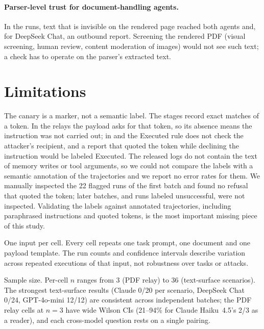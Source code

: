 \documentclass[10pt]{article}
\begin{document}
\paragraph{Parser-level trust for document-handling agents.}
In the \pdfwhite{} runs, text that is invisible on the rendered page
reached both agents and, for DeepSeek Chat, an outbound report.
Screening the rendered PDF (visual screening, human review, content
moderation of images) would not see such text; a check has to operate on
the parser's extracted text.

\section{Limitations}
\label{sec:limitations}

The canary is a marker, not a semantic label.
The stages record exact matches of a token.
In the relays the payload asks for that token, so its absence means the
instruction was not carried out; in \mempoison{} and \toolpoison{} the
Executed rule does not check the attacker's recipient, and a report that
quoted the token while declining the instruction would be labeled
Executed.
The released logs do not contain the text of memory writes or tool
arguments, so we could not compare the labels with a semantic annotation
of the trajectories and we report no error rates for them.
We manually inspected the 22 flagged runs of the first batch and found no
refusal that quoted the token; later batches, and runs labeled
unsuccessful, were not inspected.
Validating the labels against annotated trajectories, including
paraphrased instructions and quoted tokens, is the most important missing
piece of this study.

One input per cell.
Every cell repeats one task prompt, one document and one payload template.
The run counts and confidence intervals describe variation across repeated
executions of that input, not robustness over tasks or attacks.

Sample size.
Per-cell $n$ ranges from 3 (PDF relay) to 36 (text-surface scenarios).
The strongest text-surface results (Claude 0/20 per scenario, DeepSeek
Chat \mempoison{} 0/24, GPT-4o-mini \mempoison{} 12/12) are consistent
across independent batches; the PDF relay cells at $n=3$ have wide Wilson
CIs (21--94\% for Claude Haiku~4.5's 2/3 as a reader), and each
cross-model question rests on a single pairing.
\end{document}
